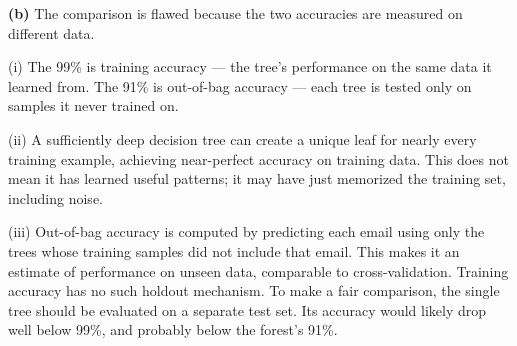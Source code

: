 \documentclass[11pt,a4paper]{article}
\begin{document}
\medskip
\textbf{(b)} The comparison is flawed because the two accuracies are measured on different data.

(i) The 99\% is training accuracy --- the tree's performance on the same data it learned from. The 91\% is out-of-bag accuracy --- each tree is tested only on samples it never trained on.

(ii) A sufficiently deep decision tree can create a unique leaf for nearly every training example, achieving near-perfect accuracy on training data. This does not mean it has learned useful patterns; it may have just memorized the training set, including noise.

(iii) Out-of-bag accuracy is computed by predicting each email using only the trees whose training samples did not include that email. This makes it an estimate of performance on unseen data, comparable to cross-validation. Training accuracy has no such holdout mechanism. To make a fair comparison, the single tree should be evaluated on a separate test set. Its accuracy would likely drop well below 99\%, and probably below the forest's 91\%.
\end{document}
